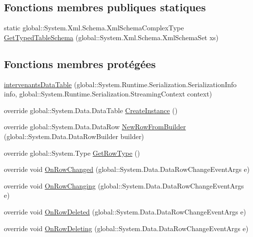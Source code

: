 \subsection*{Fonctions membres publiques statiques}
\begin{DoxyCompactItemize}
\item 
static global\+::\+System.\+Xml.\+Schema.\+Xml\+Schema\+Complex\+Type \hyperlink{classforma_1_1formadb_data_set_1_1intervenants_data_table_a68d839746c88f1d01644432836661027}{Get\+Typed\+Table\+Schema} (global\+::\+System.\+Xml.\+Schema.\+Xml\+Schema\+Set xs)
\end{DoxyCompactItemize}
\subsection*{Fonctions membres protégées}
\begin{DoxyCompactItemize}
\item 
\hyperlink{classforma_1_1formadb_data_set_1_1intervenants_data_table_a647bef62b37d9e773eadb3aace8a90c6}{intervenants\+Data\+Table} (global\+::\+System.\+Runtime.\+Serialization.\+Serialization\+Info info, global\+::\+System.\+Runtime.\+Serialization.\+Streaming\+Context context)
\item 
override global\+::\+System.\+Data.\+Data\+Table \hyperlink{classforma_1_1formadb_data_set_1_1intervenants_data_table_ac03c6e15046623e0c4bde9da85c21c72}{Create\+Instance} ()
\item 
override global\+::\+System.\+Data.\+Data\+Row \hyperlink{classforma_1_1formadb_data_set_1_1intervenants_data_table_a3f30641c7836ebf5c65caaa9db00ee27}{New\+Row\+From\+Builder} (global\+::\+System.\+Data.\+Data\+Row\+Builder builder)
\item 
override global\+::\+System.\+Type \hyperlink{classforma_1_1formadb_data_set_1_1intervenants_data_table_adc528b87783464005b884e622e9afdb6}{Get\+Row\+Type} ()
\item 
override void \hyperlink{classforma_1_1formadb_data_set_1_1intervenants_data_table_ab4e4c9f07cea5549b27b100fbe8011c8}{On\+Row\+Changed} (global\+::\+System.\+Data.\+Data\+Row\+Change\+Event\+Args e)
\item 
override void \hyperlink{classforma_1_1formadb_data_set_1_1intervenants_data_table_a6f0da7f4ea1797ebe5285172550f0d99}{On\+Row\+Changing} (global\+::\+System.\+Data.\+Data\+Row\+Change\+Event\+Args e)
\item 
override void \hyperlink{classforma_1_1formadb_data_set_1_1intervenants_data_table_aca253285d4960bb7d6f09dbbcca19911}{On\+Row\+Deleted} (global\+::\+System.\+Data.\+Data\+Row\+Change\+Event\+Args e)
\item 
override void \hyperlink{classforma_1_1formadb_data_set_1_1intervenants_data_table_a0498f353baa2319dd2094f8e987a35bb}{On\+Row\+Deleting} (global\+::\+System.\+Data.\+Data\+Row\+Change\+Event\+Args e)
\end{DoxyCompactItemize}
